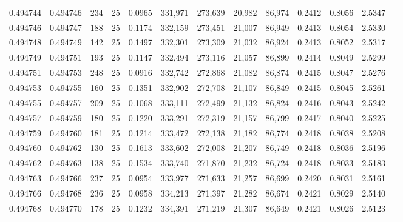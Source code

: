 \begin{tabular}{rrrrrrrrrrrrr}
0.494744 & 0.494746 &   234 &  25 &                                     0.0965 & 331,971 & 273,639 &  20,982 &  86,974 & 0.2412 & 0.8056 & 2.5347 \\
0.494746 & 0.494747 &   188 &  25 &                                     0.1174 & 332,159 & 273,451 &  21,007 &  86,949 & 0.2413 & 0.8054 & 2.5330 \\
0.494748 & 0.494749 &   142 &  25 &                                     0.1497 & 332,301 & 273,309 &  21,032 &  86,924 & 0.2413 & 0.8052 & 2.5317 \\
0.494749 & 0.494751 &   193 &  25 &                                     0.1147 & 332,494 & 273,116 &  21,057 &  86,899 & 0.2414 & 0.8049 & 2.5299 \\
0.494751 & 0.494753 &   248 &  25 &                                     0.0916 & 332,742 & 272,868 &  21,082 &  86,874 & 0.2415 & 0.8047 & 2.5276 \\
0.494753 & 0.494755 &   160 &  25 &                                     0.1351 & 332,902 & 272,708 &  21,107 &  86,849 & 0.2415 & 0.8045 & 2.5261 \\
0.494755 & 0.494757 &   209 &  25 &                                     0.1068 & 333,111 & 272,499 &  21,132 &  86,824 & 0.2416 & 0.8043 & 2.5242 \\
0.494757 & 0.494759 &   180 &  25 &                                     0.1220 & 333,291 & 272,319 &  21,157 &  86,799 & 0.2417 & 0.8040 & 2.5225 \\
0.494759 & 0.494760 &   181 &  25 &                                     0.1214 & 333,472 & 272,138 &  21,182 &  86,774 & 0.2418 & 0.8038 & 2.5208 \\
0.494760 & 0.494762 &   130 &  25 &                                     0.1613 & 333,602 & 272,008 &  21,207 &  86,749 & 0.2418 & 0.8036 & 2.5196 \\
0.494762 & 0.494763 &   138 &  25 &                                     0.1534 & 333,740 & 271,870 &  21,232 &  86,724 & 0.2418 & 0.8033 & 2.5183 \\
0.494763 & 0.494766 &   237 &  25 &                                     0.0954 & 333,977 & 271,633 &  21,257 &  86,699 & 0.2420 & 0.8031 & 2.5161 \\
0.494766 & 0.494768 &   236 &  25 &                                     0.0958 & 334,213 & 271,397 &  21,282 &  86,674 & 0.2421 & 0.8029 & 2.5140 \\
0.494768 & 0.494770 &   178 &  25 &                                     0.1232 & 334,391 & 271,219 &  21,307 &  86,649 & 0.2421 & 0.8026 & 2.5123 \\

\end{tabular}
